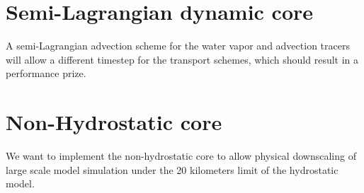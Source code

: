 \section{Semi-Lagrangian dynamic core}

A semi-Lagrangian advection scheme for the water vapor and advection tracers
will allow a different timestep for the transport schemes, which should result
in a performance prize.

\section{Non-Hydrostatic core}

We want to implement the non-hydrostatic core to allow physical downscaling
of large scale model simulation under the 20 kilometers limit of the
hydrostatic model.
